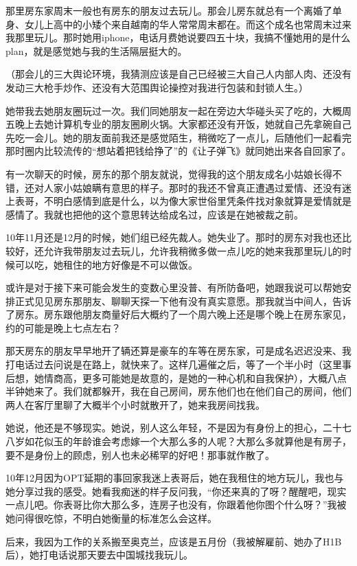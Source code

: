 \documentclass[9pt, b5paper]{article}
\begin{document}
那里房东家周末一般也有房东的朋友过去玩儿。那会儿房东就总有一个离婚了单身、女儿上高中的小矮个来自越南的华人常常周末都在。而这个成名也常周末过来我那里玩儿。那时她用iphone，电话月费她说要四五十块，我搞不懂她用的是什么plan，就是感觉她与我的生活隔层挺大的。 

（那会儿的三大舆论环境，我猜测应该是自己已经被三大自己人内部人肉、还没有发动三大枪手炒作、还没有大范围舆论操控对我进行包装和封锁人生。）

她带我去她朋友圈玩过一次。我们同她朋友一起在旁边大华碰头买了吃的，大概周五晚上去她计算机专业的朋友圈刷火锅。大家都还没有开饭，她就自己先拿碗自己先吃一会儿。她的朋友面前我还是感觉陌生，稍微吃了一点儿，后随他们一起看完那时圈内比较流传的“想站着把钱给挣了”的《让子弹飞》就同她出来各自回家了。 

有一次聊天的时候，房东的那个朋友就说，觉得我的这个朋友成名小姑娘长得不错，还对人家小姑娘瞒有意思的样子。那时的我还不曾真正遭遇过爱情、还没有迷上表哥，不明白感情到底是什么，以为像大家世俗里凭条件找对象就算是爱情就是感情了。我就也把他的这个意思转达给成名过，应该是在她被裁之前。

10年11月还是12月的时候，她们组已经先裁人。她失业了。那时的房东对我也还比较好，还允许我带朋友过去玩儿，允许我稍微多做一点儿吃的她来我那里玩儿的时候可以吃，她租住的地方好像是不可以做饭。 

或许是对于接下来可能会发生的变数心里没普、有所防备吧，她跟我说可以帮她安排正式见见房东那朋友、聊聊天探一下他有没有真实意愿。那我就当中间人，告诉了房东。房东跟他朋友商量好后大概约了一个周六晚上还是哪个晚上在房东家见，约的可能是晚上七点左右？

那天房东的朋友早早地开了辆还算是豪车的车等在房东家，可是成名迟迟没来、我打电话过去问说是在路上，就快来了。这样几遍催之后，等了一个半小时（这里事后想，她情商高，更多可能她是故意的，是她的一种心机和自我保护），大概八点半钟她来了。我们就都躲开，我在自己房间，房东他们也在他们自己的房间，他们两人在客厅里聊了大概半个小时就散开了，她来我房间找我。

她说，他还是不够现实。她说，别人这么年轻，不是因为有身份上的担心，二十七八岁如花似玉的年龄谁会考虑嫁一个大那么多的人呢？大那么多就算他是有房子，要不是身份上的顾虑，别人也未必稀罕的好吧！那事就作散了。 

10年12月因为OPT延期的事回家我迷上表哥后，她在我租住的地方玩儿，我也与她分享过我的感受。她看我痴迷的样子反问我，“你还来真的了呀？醒醒吧，现实一点儿吧。你表哥比你大那么多，连房子也没有，你跟着他你图个什么呀？”我被她问得很吃惊，不明白她衡量的标准怎么会这样。 

后来，我因为工作的关系搬至奥克兰，应该是五月份（我被解雇前、她办了H1B后），她打电话说那天要去中国城找我玩儿。
\end{document}

